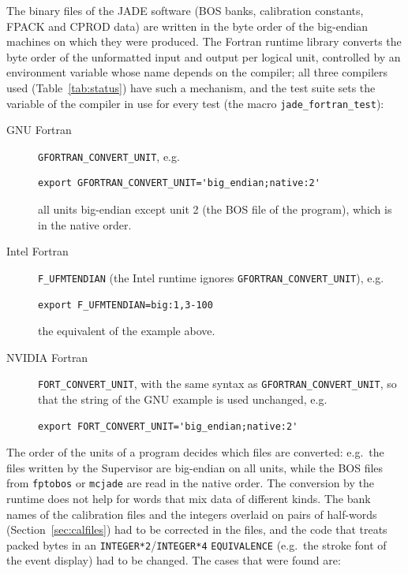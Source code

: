 The binary files of the JADE software (BOS banks, calibration constants, FPACK and CPROD data) are written in the
byte order of the big-endian machines on which they were produced. The Fortran runtime library converts the byte order
of the unformatted input and output per logical unit, controlled by an environment variable whose name depends
on the compiler; all three compilers used (Table~\ref{tab:status}) have such a mechanism, and the test suite
sets the variable of the compiler in use for every test (the macro \texttt{jade\_\allowbreak{}fortran\_\allowbreak{}test}):
\begin{description}
\item[GNU Fortran] \texttt{GFORTRAN\_\allowbreak{}CONVERT\_\allowbreak{}UNIT}, e.g.
\begin{lstlisting}
export GFORTRAN_CONVERT_UNIT='big_endian;native:2'
\end{lstlisting}
all units big-endian except unit 2 (the BOS file of the program), which is in the native order.
\item[Intel Fortran] \texttt{F\_\allowbreak{}UFMTENDIAN} (the Intel runtime ignores \texttt{GFORTRAN\_\allowbreak{}CONVERT\_\allowbreak{}UNIT}),
e.g.
\begin{lstlisting}
export F_UFMTENDIAN=big:1,3-100
\end{lstlisting}
the equivalent of the example above.
\item[NVIDIA Fortran] \texttt{FORT\_\allowbreak{}CONVERT\_\allowbreak{}UNIT}, with the same syntax as \texttt{GFORTRAN\_\allowbreak{}CONVERT\_\allowbreak{}UNIT}, so that the
string of the GNU example is used unchanged, e.g.
\begin{lstlisting}
export FORT_CONVERT_UNIT='big_endian;native:2'
\end{lstlisting}
\end{description}
The order of the units of a program decides which files are converted: e.g.\ the files written by the Supervisor
are big-endian on all units, while the BOS files from \texttt{fptobos} or \texttt{mcjade} are read in the native
order. The conversion by the runtime does not help for words that mix data of different kinds. The
bank names of the calibration files and the integers overlaid on pairs of half-words
(Section~\ref{sec:calfiles}) had to be corrected in the files, and the code that treats packed bytes in an
\texttt{INTEGER*2}/\texttt{INTEGER*4} \texttt{EQUIVALENCE} (e.g.\ the stroke font of the event display) had to be
changed. The cases that were found are:
